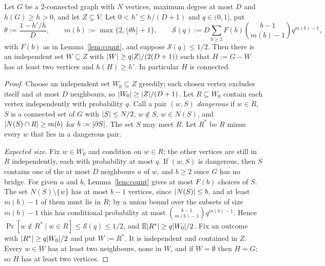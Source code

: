\begin{lemma}\label{lem:delete}
Let $G$ be a 2-connected graph with $N$ vertices, maximum degree at most $D$ and $h(G)\ge h>0$, and let $Z\subseteq V$. Let $0<h'\le h/(D+1)$ and $q\in(0,1]$, put
\[
  \theta:=\frac{1-h'/h}{D},\qquad m(b):=\max\{2,\lfloor\theta b\rfloor+1\},\qquad
  \mathcal S(q):=D\sum_{b\ge2}F(b)\binom{b-1}{m(b)-1}q^{m(b)-1},
\]
with $F(b)$ as in Lemma~\ref{lem:count}, and suppose $\mathcal S(q)\le1/2$. Then there is an independent set $W\subseteq Z$ with $\lvert W\rvert\ge q\lvert Z\rvert/(2(D+1))$ such that $H:=G-W$ has at least two vertices and $h(H)\ge h'$. In particular $H$ is connected.
\end{lemma}

\begin{proof}
Choose an independent set $W_0\subseteq Z$ greedily; each chosen vertex excludes itself and at most $D$ neighbours, so $\lvert W_0\rvert\ge\lvert Z\rvert/(D+1)$. Let $R\subseteq W_0$ contain each vertex independently with probability $q$. Call a pair $(w,S)$ \emph{dangerous} if $w\in R$, $S$ is a connected set of $G$ with $\lvert S\rvert\le N/2$, $w\notin S$, $w\in N(S)$, and $\lvert N(S)\cap R\rvert\ge m(b)$ for $b:=\lvert \partial S\rvert$. The set $S$ may meet $R$. Let $R^*$ be $R$ minus every $w$ that lies in a dangerous pair.

\emph{Expected size.} Fix $w\in W_0$ and condition on $w\in R$; the other vertices are still in $R$ independently, each with probability at most $q$. If $(w,S)$ is dangerous, then $S$ contains one of the at most $D$ neighbours $u$ of $w$, and $b\ge2$ since $G$ has no bridge. For given $u$ and $b$, Lemma~\ref{lem:count} gives at most $F(b)$ choices of $S$. The set $N(S)\setminus\{w\}$ has at most $b-1$ vertices, since $\lvert N(S)\rvert\le b$, and at least $m(b)-1$ of them must lie in $R$; by a union bound over the subsets of size $m(b)-1$ this has conditional probability at most $\binom{b-1}{m(b)-1}q^{m(b)-1}$. Hence $\Pr[w\notin R^*\mid w\in R]\le\mathcal S(q)\le1/2$, and $\mathbb{E}\lvert R^*\rvert\ge q\lvert W_0\rvert/2$. Fix an outcome with $\lvert R^*\rvert\ge q\lvert W_0\rvert/2$ and put $W:=R^*$. It is independent and contained in $Z$. Every $w\in W$ has at least two neighbours, none in $W$, and if $W=\emptyset$ then $H=G$; so $H$ has at least two vertices.


\end{proof}
